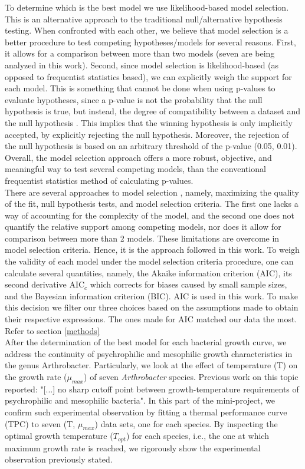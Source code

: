 \documentclass[titlepage,11pt]{article}
\begin{document}
\begin{linenumbers}
	To determine which is the best model we use likelihood-based model selection. This is an alternative approach to the traditional null/alternative hypothesis testing. When confronted with each other, we believe that model selection is a better procedure to test competing hypotheses/models for several reasons. First, it allows for a comparison between more than two models (seven are being analyzed in this work). Second, since model selection is likelihood-based (as opposed to frequentist statistics based), we can explicitly weigh the support for each model. This is something that cannot be done when using p-values to evaluate hypotheses, since a p-value is not the probability that the null hypothesis is true, but instead, the degree of compatibility between a dataset and the null hypothesis \cite{RonaldL.Wasserstein, Kim2016}. This implies that the winning hypothesis is only implicitly accepted, by explicitly rejecting the null hypothesis. Moreover, the rejection of the null hypothesis is based on an arbitrary threshold of the p-value (0.05, 0.01). Overall, the model selection approach offers a more robust, objective, and meaningful way to test several competing models, than the conventional frequentist statistics method of calculating p-values. \\
	There are several approaches to model selection \cite{Johnson2004}, namely,  maximizing the quality of the fit, null hypothesis tests, and model selection criteria. The first one lacks a way of accounting for the complexity of the model, and the second one does not quantify the relative support among competing models, nor does it allow for comparison between more than 2 models. These limitations are overcome in model selection criteria. Hence, it is the approach followed in this work.
	To weigh the validity of each model under the model selection criteria procedure, one can calculate several quantities, namely, the Akaike information criterion (AIC), its second derivative AIC$_c$ which corrects for biases caused by small sample sizes, and the Bayesian information criterion (BIC). AIC is used in this work. To make this decision we filter our three choices based on the assumptions made to obtain their respective expressions. The ones made for AIC matched our data the most. Refer to section \ref{methods} \\
	
	After the determination of the best model for each bacterial growth curve, we address the continuity of psychrophilic and mesophilic growth characteristics in the genus Arthrobacter. Particularly, we look at the effect of temperature (T) on the growth rate ($\mu_{max}$) of seven \textit{Arthrobacter} species. Previous work on this topic \cite{ROTH1962} reported: "[...] no sharp cutoff point between growth-temperature requirements of psychrophilic and mesophilic bacteria". In this part of the mini-project, we confirm such experimental observation by fitting a thermal performance curve (TPC) \cite{Lactin1995} to seven (T, $ \mu_{max} $) data sets, one for each species. By inspecting the optimal growth temperature ($ T_{opt} $) for each species, i.e., the one at which maximum growth rate is reached, we rigorously show the experimental observation previously stated.

\end{linenumbers}
\end{document}
